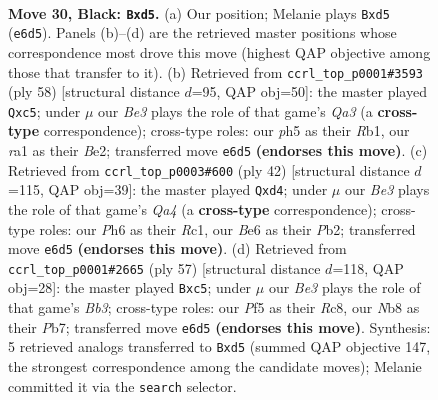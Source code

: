 \documentclass[11pt]{article}
\begin{document}
\clearpage

\begin{figure}[p]\centering
\begin{subfigure}{0.46\textwidth}\centering
\resizebox{\linewidth}{!}{%
\newchessgame
\chessboard[
  setfen={rn2nk2/1p5p/4b2p/p1PB1p1P/P6P/1N6/1q6/RN1Q2K1 b - - 4 30},
  showmover=false,
  pgfstyle=straightmove, color=movearrow, markmove={e6-d5}
]}
\caption{}
\end{subfigure}\hfill
\begin{subfigure}{0.46\textwidth}\centering
\resizebox{\linewidth}{!}{%
\newchessgame
\chessboard[
  setfen={2nqr2k/2pb3p/6p1/2bPp3/4p3/Q6P/4BPP1/1R1N2K1 w - - 0 30},
  showmover=false,
  pgfstyle=straightmove, color=movearrow, markmove={a3-c5}
]}
\caption{}
\end{subfigure}
\\[4pt]
\begin{subfigure}{0.46\textwidth}\centering
\resizebox{\linewidth}{!}{%
\newchessgame
\chessboard[
  setfen={4r3/pp3ppk/4qn2/8/Q2b1B2/7P/PP3PP1/2R3K1 w - - 0 22},
  showmover=false,
  pgfstyle=straightmove, color=movearrow, markmove={a4-d4}
]}
\caption{}
\end{subfigure}\hfill
\begin{subfigure}{0.46\textwidth}\centering
\resizebox{\linewidth}{!}{%
\newchessgame
\chessboard[
  setfen={2r4k/1p1q2pp/pb5n/2B5/PPQN4/8/6PP/5R1K b - - 3 29},
  showmover=false,
  pgfstyle=straightmove, color=movearrow, markmove={b6-c5}
]}
\caption{}
\end{subfigure}
\caption{\textbf{Move 30, Black: \texttt{Bxd5}.} (a) Our position; Melanie plays \texttt{Bxd5} (\texttt{e6d5}). Panels (b)--(d) are the retrieved master positions whose correspondence most drove this move (highest QAP objective among those that transfer to it). (b) Retrieved from \texttt{ccrl\_top\_p0001\#3593} (ply 58) [structural distance $d$=95, QAP obj=50]: the master played \texttt{Qxc5}; under $\mu$ our \emph{Be3} plays the role of that game's \emph{Qa3} (a \textbf{cross-type} correspondence); cross-type roles: our \emph{p}h5 as their \emph{R}b1, our \emph{r}a1 as their \emph{B}e2; transferred move \texttt{e6d5} \textbf{(endorses this move)}. (c) Retrieved from \texttt{ccrl\_top\_p0003\#600} (ply 42) [structural distance $d$=115, QAP obj=39]: the master played \texttt{Qxd4}; under $\mu$ our \emph{Be3} plays the role of that game's \emph{Qa4} (a \textbf{cross-type} correspondence); cross-type roles: our \emph{P}h6 as their \emph{R}c1, our \emph{B}e6 as their \emph{P}b2; transferred move \texttt{e6d5} \textbf{(endorses this move)}. (d) Retrieved from \texttt{ccrl\_top\_p0001\#2665} (ply 57) [structural distance $d$=118, QAP obj=28]: the master played \texttt{Bxc5}; under $\mu$ our \emph{Be3} plays the role of that game's \emph{Bb3}; cross-type roles: our \emph{P}f5 as their \emph{R}c8, our \emph{N}b8 as their \emph{P}b7; transferred move \texttt{e6d5} \textbf{(endorses this move)}. Synthesis: 5 retrieved analogs transferred to \texttt{Bxd5} (summed QAP objective 147, the strongest correspondence among the candidate moves); Melanie committed it via the \texttt{search} selector.}
\label{fig:thought-m59}
\end{figure}
\end{document}
